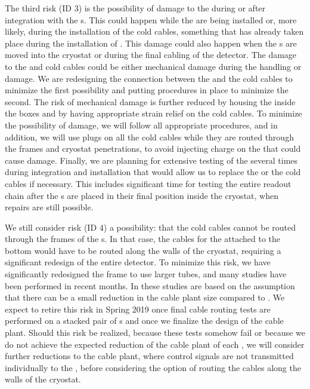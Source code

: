 The third risk (ID 3) is the possibility of damage to the 
 during or after integration with the s. This could
happen while the  are being installed or, more likely, during the
installation of the cold cables, something that has already taken place during
the installation of . This damage could also happen when the s are
moved into the cryostat or during the final cabling of the detector. The damage
to the  and cold cables could be either mechanical damage during the
handling or  damage. We are redesigning the connection between the 
and the cold cables to minimize the first possibility and putting procedures in place
to minimize the second. The risk of mechanical damage
is further reduced by housing the  inside the  boxes and by having 
appropriate strain relief on the cold cables. To minimize the possibility of
 damage, we will follow all appropriate procedures, and in addition,
we will use plugs on all the cold cables while they are routed through the
 frames and cryostat penetrations, to avoid injecting charge on
the  that could cause  damage. Finally, we are planning for
extensive testing of the  several times during integration
and installation that would allow us to replace the 
or the cold cables if necessary. This includes significant time for testing the entire readout 
chain after the s are placed in their final position inside the cryostat,
when repairs are still possible.

We still consider risk (ID 4) a possibility: that the cold cables cannot
be routed through the frames of the s. In that case, the cables for the
 attached to the bottom  would have to be routed along the
walls of the cryostat, requiring a significant redesign of the entire detector. 
To minimize this risk, we have significantly redesigned the  frame 
to use larger tubes, and many studies have been performed in recent months.
In these studies are based on the assumption that there can be a small reduction in
the cable plant size compared to . We expect to retire this risk
in Spring 2019 once final cable routing tests are performed on
a stacked pair of s and once we finalize the design of the  cable plant. Should
this risk be realized, because these tests somehow fail or because we do not 
achieve the expected reduction of the cable plant of each , we will 
consider further reductions to the cable plant, where control signals are not
transmitted individually to the , before considering the option of 
routing the cables along the walls of the cryostat.

